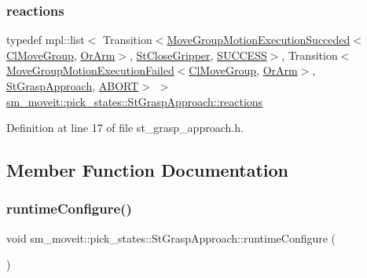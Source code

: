 \subsubsection{\texorpdfstring{reactions}{reactions}}
{\footnotesize\ttfamily typedef mpl\+::list$<$ Transition$<$\hyperlink{structmoveit__z__client_1_1MoveGroupMotionExecutionSucceded}{Move\+Group\+Motion\+Execution\+Succeded}$<$\hyperlink{classmoveit__z__client_1_1ClMoveGroup}{Cl\+Move\+Group}, \hyperlink{classsm__moveit_1_1OrArm}{Or\+Arm}$>$, \hyperlink{structsm__moveit_1_1pick__states_1_1StCloseGripper}{St\+Close\+Gripper}, \hyperlink{classSUCCESS}{S\+U\+C\+C\+E\+SS}$>$, Transition$<$\hyperlink{structmoveit__z__client_1_1MoveGroupMotionExecutionFailed}{Move\+Group\+Motion\+Execution\+Failed}$<$\hyperlink{classmoveit__z__client_1_1ClMoveGroup}{Cl\+Move\+Group}, \hyperlink{classsm__moveit_1_1OrArm}{Or\+Arm}$>$, \hyperlink{structsm__moveit_1_1pick__states_1_1StGraspApproach}{St\+Grasp\+Approach}, \hyperlink{classABORT}{A\+B\+O\+RT}$>$ $>$ \hyperlink{structsm__moveit_1_1pick__states_1_1StGraspApproach_a459914092dd4d74c25550ca4438a3ff4}{sm\+\_\+moveit\+::pick\+\_\+states\+::\+St\+Grasp\+Approach\+::reactions}}



Definition at line 17 of file st\+\_\+grasp\+\_\+approach.\+h.



\subsection{Member Function Documentation}
\mbox{\label{structsm__moveit_1_1pick__states_1_1StGraspApproach_a2f8bdc983aeb3ba4b0d2e2f0c4e12d8d}} 
\subsubsection{\texorpdfstring{runtime\+Configure()}{runtimeConfigure()}}
{\footnotesize\ttfamily void sm\+\_\+moveit\+::pick\+\_\+states\+::\+St\+Grasp\+Approach\+::runtime\+Configure (\begin{DoxyParamCaption}{ }\end{DoxyParamCaption})\hspace{0.3cm}{\ttfamily [inline]}}



